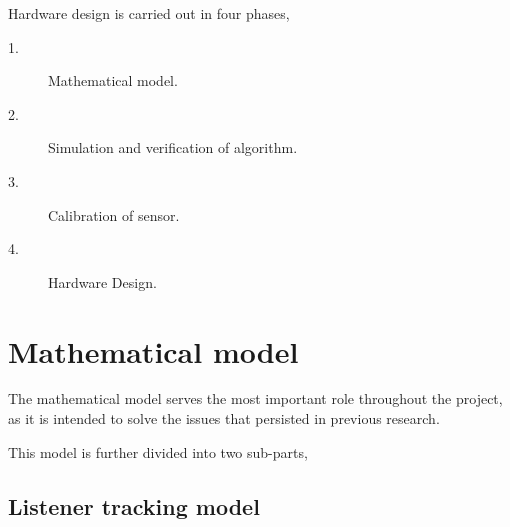 \documentclass[../../../patent_v1.tex]{subfiles}
\begin{document}
    
Hardware design is carried out in four phases,

\begin{description}
    \item[1.]Mathematical model.
    \item[2.]Simulation and verification of algorithm.
    \item[3.]Calibration of sensor.
    \item[4.]Hardware Design. 
\end{description}

\section{Mathematical model}

The mathematical model serves the most important role throughout the project, as it is 
intended to solve the issues that persisted in previous research. 

This model is further divided into two sub-parts,

\subsection{Listener tracking model}


\end{document}
